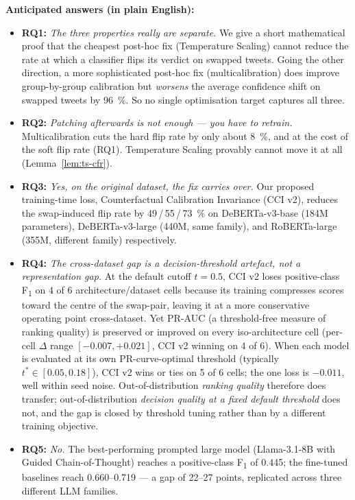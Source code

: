 \documentclass[10pt,a4paper]{article}
\begin{document}
\textbf{Anticipated answers (in plain English):}

\begin{itemize}[leftmargin=*,itemsep=3pt]
\item \textbf{RQ1:} \emph{The three properties really are separate.} We give
    a short mathematical proof that the cheapest post-hoc fix (Temperature
    Scaling) cannot reduce the rate at which a classifier flips its verdict
    on swapped tweets. Going the other direction, a more sophisticated
    post-hoc fix (multicalibration) does improve group-by-group calibration
    but \emph{worsens} the average confidence shift on swapped tweets by
    96~\%. So no single optimisation target captures all three.
\item \textbf{RQ2:} \emph{Patching afterwards is not enough --- you have to
    retrain.} Multicalibration cuts the hard flip rate by only about 8~\%,
    and at the cost of the soft flip rate (RQ1). Temperature Scaling
    provably cannot move it at all (Lemma~\ref{lem:ts-cfr}).
\item \textbf{RQ3:} \emph{Yes, on the original dataset, the fix carries
    over.} Our proposed training-time loss, Counterfactual Calibration
    Invariance (CCI v2), reduces the swap-induced flip rate by
    49\,/\,55\,/\,73~\% on DeBERTa-v3-base (184M parameters),
    DeBERTa-v3-large (440M, same family), and RoBERTa-large (355M,
    different family) respectively.
\item \textbf{RQ4:} \emph{The cross-dataset gap is a decision-threshold
    artefact, not a representation gap.} At the default cutoff
    $t{=}0.5$, CCI v2 loses positive-class F\textsubscript{1} on 4 of
    6 architecture/dataset cells because its training compresses scores
    toward the centre of the swap-pair, leaving it at a more conservative
    operating point cross-dataset. Yet PR-AUC (a threshold-free measure
    of ranking quality) is preserved or improved on every iso-architecture
    cell (per-cell $\Delta$ range $[-0.007, +0.021]$, CCI v2 winning on
    4 of 6). When each model is evaluated at its own PR-curve-optimal
    threshold (typically $t^* \in [0.05, 0.18]$), CCI v2 wins or ties on
    5 of 6 cells; the one loss is $-0.011$, well within seed noise.
    Out-of-distribution \emph{ranking quality} therefore does transfer;
    out-of-distribution \emph{decision quality at a fixed default threshold}
    does not, and the gap is closed by threshold tuning rather than by
    a different training objective.
\item \textbf{RQ5:} \emph{No.} The best-performing prompted large model
    (Llama-3.1-8B with Guided Chain-of-Thought) reaches a positive-class
    F\textsubscript{1} of 0.445; the fine-tuned baselines reach 0.660--0.719
    --- a gap of 22--27 points, replicated across three different LLM
    families.
\end{itemize}
\end{document}
